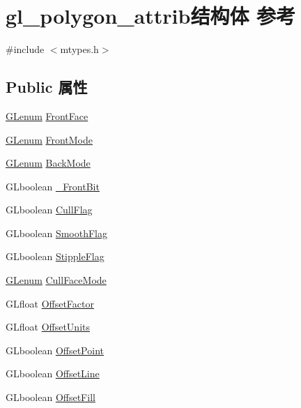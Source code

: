 \hypertarget{structgl__polygon__attrib}{}\section{gl\+\_\+polygon\+\_\+attrib结构体 参考}
\label{structgl__polygon__attrib}


{\ttfamily \#include $<$mtypes.\+h$>$}

\subsection*{Public 属性}
\begin{DoxyCompactItemize}
\item 
\hyperlink{interfacevoid}{G\+Lenum} \hyperlink{structgl__polygon__attrib_a13f1cfa11a943787240fdcc16938e240}{Front\+Face}
\item 
\hyperlink{interfacevoid}{G\+Lenum} \hyperlink{structgl__polygon__attrib_a9db397247cea61ec3b210f492b4d139b}{Front\+Mode}
\item 
\hyperlink{interfacevoid}{G\+Lenum} \hyperlink{structgl__polygon__attrib_a3cadb266ec4a6a2c4c9d1afe9b68bc6d}{Back\+Mode}
\item 
G\+Lboolean \hyperlink{structgl__polygon__attrib_a7a07f46720ee2aeefcb3db4c90666232}{\+\_\+\+Front\+Bit}
\item 
G\+Lboolean \hyperlink{structgl__polygon__attrib_a8694a29f8218b5f11b3113e0e6de936c}{Cull\+Flag}
\item 
G\+Lboolean \hyperlink{structgl__polygon__attrib_aa96caf195145fff61a8d5145fca53b55}{Smooth\+Flag}
\item 
G\+Lboolean \hyperlink{structgl__polygon__attrib_a5f748675063df5971bd2f815c0b7b3ff}{Stipple\+Flag}
\item 
\hyperlink{interfacevoid}{G\+Lenum} \hyperlink{structgl__polygon__attrib_a5b72a38a92447e6c38bf2ef0f57d4f7e}{Cull\+Face\+Mode}
\item 
G\+Lfloat \hyperlink{structgl__polygon__attrib_a2d7d77d254a36049fb971065aaf29745}{Offset\+Factor}
\item 
G\+Lfloat \hyperlink{structgl__polygon__attrib_a8e41d854dc6e1d9fdff2335f8a90b1cf}{Offset\+Units}
\item 
G\+Lboolean \hyperlink{structgl__polygon__attrib_acb8d9b4bd583409752ecb8b48ef8ecb0}{Offset\+Point}
\item 
G\+Lboolean \hyperlink{structgl__polygon__attrib_a8c59eb820476a456fe95b85f6624e773}{Offset\+Line}
\item 
G\+Lboolean \hyperlink{structgl__polygon__attrib_a4ab18ea33bb660e45666d09d4c9c56fb}{Offset\+Fill}
\end{DoxyCompactItemize}


